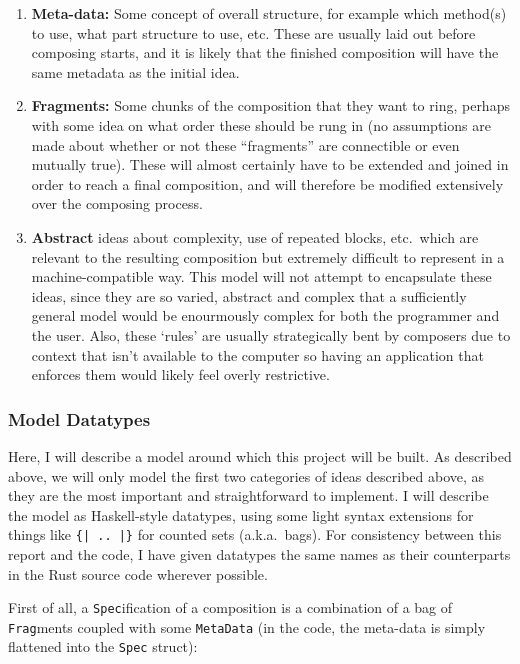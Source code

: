 \documentclass[12pt]{article}
\begin{document}
\begin{enumerate}
    \item \textbf{Meta-data:} Some concept of overall structure, for example which method(s) to use,
        what part structure to use, etc.  These are usually laid out before composing starts, and
        it is likely that the finished composition will have the same metadata as the initial idea.
    \item \textbf{Fragments:} Some chunks of the composition that they want to ring, perhaps with
        some idea on what order these should be rung in (no assumptions are made about whether or
        not these ``fragments'' are connectible or even mutually true).  These will almost certainly
        have to be extended and joined in order to reach a final composition, and will therefore be
        modified extensively over the composing process.
    \item \textbf{Abstract} ideas about complexity, use of repeated blocks, etc.\ which are
        relevant to the resulting composition but extremely difficult to represent in a
        machine-compatible way.  This model will not attempt to encapsulate these ideas, since they
        are so varied, abstract and complex that a sufficiently general model would be enourmously
        complex for both the programmer and the user.  Also, these `rules' are usually strategically
        bent by composers due to context that isn't available to the computer so having an
        application that enforces them would likely feel overly restrictive.
\end{enumerate}

\subsubsection{Model Datatypes}

Here, I will describe a model around which this project will be built.  As described above, we will
only model the first two categories of ideas described above, as they are the most important and
straightforward to implement.  I will describe the model as Haskell-style datatypes, using some
light syntax extensions for things like \verb+{| .. |}+ for counted sets (a.k.a.\ bags).  For
consistency between this report and the code, I have given datatypes the same
names as their counterparts in the Rust source code wherever possible.

First of all, a \verb|Spec|ification of a composition is a combination of a bag of \verb|Frag|ments
coupled with some \verb|MetaData| (in the code, the meta-data is simply flattened into the
\verb|Spec| struct):
\end{document}
